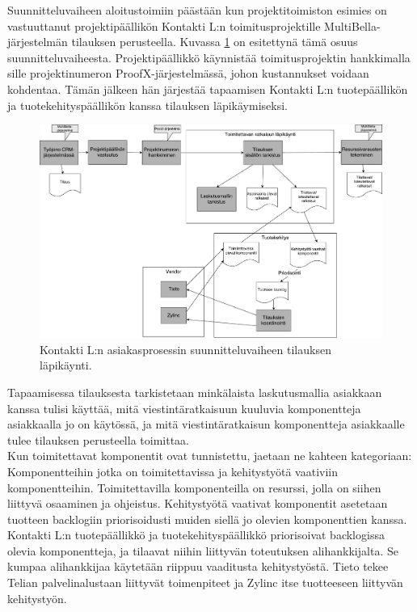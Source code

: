 \documentclass[finnish,12pt,a4paper,pdftex]{article}
\begin{document}
Suunnitteluvaiheen aloitustoimiin päästään kun projektitoimiston esimies on vastuuttanut projektipäällikön Kontakti L:n toimitusprojektille MultiBella-järjestelmän tilauksen perusteella. Kuvassa \ref{fig:aloitustoimet} on esitettynä tämä osuus suunnitteluvaiheesta. Projektipäällikkö käynnistää toimitusprojektin hankkimalla sille projektinumeron ProofX-järjestelmässä, johon kustannukset voidaan kohdentaa. Tämän jälkeen hän järjestää tapaamisen Kontakti L:n tuotepäällikön ja tuotekehityspäällikön kanssa tilauksen läpikäymiseksi. \\

\begin{figure}[!h]
    \centering
    \includegraphics[scale=0.3]{images/aloitus.pdf}
    \caption{Kontakti L:n asiakasprosessin suunnitteluvaiheen tilauksen läpikäynti.}
    \label{fig:aloitustoimet}
\end{figure}

Tapaamisessa tilauksesta tarkistetaan minkälaista laskutusmallia asiakkaan kanssa tulisi käyttää, mitä viestintäratkaisuun kuuluvia komponentteja asiakkaalla jo on käytössä, ja mitä viestintäratkaisun komponentteja asiakkaalle tulee tilauksen perusteella toimittaa.\\

Kun toimitettavat komponentit ovat tunnistettu, jaetaan ne kahteen kategoriaan: Komponentteihin jotka on toimitettavissa ja kehitystyötä vaativiin komponentteihin. Toimitettavilla komponenteilla on resurssi, jolla on siihen liittyvä osaaminen ja ohjeistus. Kehitystyötä vaativat komponentit asetetaan tuotteen backlogiin priorisoidusti muiden siellä jo olevien komponenttien kanssa.\\

Kontakti L:n tuotepäällikkö ja tuotekehityspäällikkö priorisoivat backlogissa olevia komponentteja, ja tilaavat niihin liittyvän toteutuksen alihankkijalta. Se kumpaa alihankkijaa käytetään riippuu vaaditusta kehitystyöstä. Tieto tekee Telian palvelinalustaan liittyvät toimenpiteet ja Zylinc itse tuotteeseen liittyvän kehitystyön.\\
\end{document}
